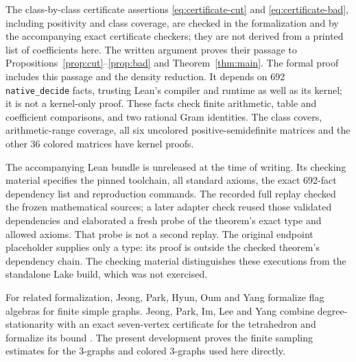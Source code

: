 \documentclass[11pt]{article}
\begin{document}
The class-by-class certificate assertions \eqref{eq:certificate-cut}
and \eqref{eq:certificate-bad}, including positivity and class coverage,
are checked in the formalization and by the accompanying exact certificate
checkers; they are not derived from a printed list of coefficients here.
The written argument proves their passage to
Propositions~\ref{prop:cut}--\ref{prop:bad} and Theorem~\ref{thm:main}.
The formal proof includes this passage and the density reduction. It
depends on 692 \texttt{native\_decide} facts, trusting Lean's compiler
and runtime as well as its kernel; it is not a kernel-only proof. These
facts check finite arithmetic, table and coefficient comparisons, and two
rational Gram identities. The class covers, arithmetic-range coverage,
all six uncolored positive-semidefinite matrices and the other 36 colored
matrices have kernel proofs.

The accompanying Lean bundle is unreleased at the time of writing.
Its checking material \cite{Checking} specifies the pinned toolchain,
all standard axioms, the exact 692-fact dependency list and reproduction
commands. The recorded full replay checked the frozen mathematical
sources; a later adapter check reused those validated dependencies and
elaborated a fresh probe of the theorem's exact type and allowed axioms.
That probe is not a second replay. The original endpoint placeholder
supplies only a type: its proof is outside the checked theorem's dependency
chain. The checking material distinguishes these executions from the
standalone Lake build, which was not exercised.

For related formalization, Jeong, Park, Hyun, Oum and Yang
\cite[Abstract]{JPHOY} formalize flag algebras for finite simple graphs.
Jeong, Park, Im, Lee and Yang combine degree-stationarity with an exact
seven-vertex certificate for the tetrahedron and formalize its bound
\cite[\S\S2.5 and~3]{Tetrahedron}.
The present development proves the finite sampling estimates for the
$3$-graphs and colored $3$-graphs used here directly.
\end{document}
